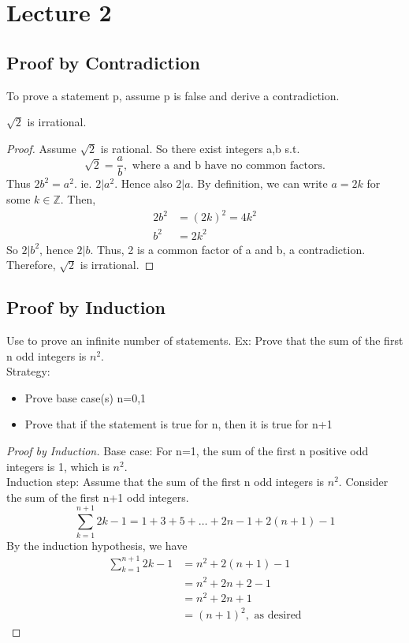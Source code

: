 \chapter{Lecture 2}
\date{August 29,2024}

\section{Proof by Contradiction}
    To prove a statement p, assume p is false and derive a contradiction.
    \begin{theorem}
        $\sqrt{2}$ is irrational.
        \begin{proof}
            Assume $\sqrt{2}$ is rational.
            So there exist integers a,b s.t. 
            \[
                \sqrt{2} = \frac{a}{b}, \text{ where a and b have no common factors.}
            \]
            Thus $2b^2=a^2$. ie. $2|a^2$.
            Hence also $2|a$. By definition, we can write $a=2k$ for some $k\in\mathbb{Z}$.
            Then,
            \begin{align*}
                2b^2 &= (2k)^2 = 4k^2 \\
                b^2 &= 2k^2
            \end{align*}
            So $2|b^2$, hence $2|b$.
            Thus, 2 is a common factor of a and b, a contradiction. \\
            Therefore, $\sqrt{2}$ is irrational.
        \end{proof}
    \end{theorem}

\section{Proof by Induction}
    Use to prove an infinite number of statements. 
    Ex: Prove that the sum of the first n odd integers is $n^2$. \\
    Strategy: 
    \begin{itemize}
        \item Prove base case(s) n=0,1
        \item Prove that if the statement is true for n, then it is true for n+1
    \end{itemize}

    \begin{proof} [Proof by Induction]
        Base case: For n=1, the sum of the first n positive odd integers is 1, which is $n^2$. \\
        Induction step: Assume that the sum of the first n odd integers is $n^2$.
        Consider the sum of the first n+1 odd integers.
        \[
            \sum_{k=1}^{n+1}2k-1 = 1+3+5+\dots+2n-1+2(n+1)-1
        \]
        By the induction hypothesis, we have
        \begin{align*}
            \sum_{k=1}^{n+1}2k-1 &= n^2+2(n+1)-1 \\
            &= n^2 + 2n + 2 - 1 \\
            &= n^2 + 2n + 1 \\
            &= (n+1)^2, \text{ as desired}
        \end{align*}
    \end{proof}


